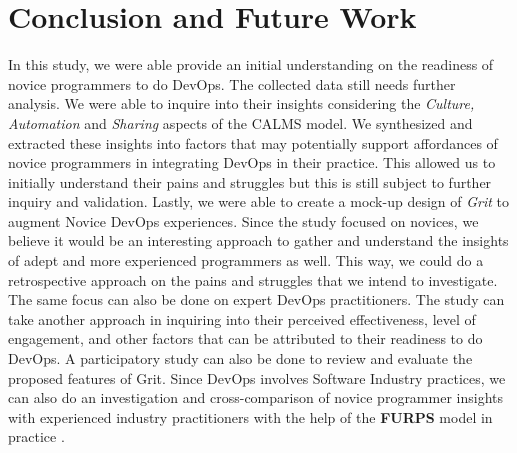 \documentclass{sigchi}
\begin{document}
\section{Conclusion and Future Work}
In this study, we were able provide an initial understanding on the readiness of novice programmers to do DevOps. The collected data still needs further analysis. We were able to inquire into their insights considering the \textit{Culture, Automation} and \textit{Sharing} aspects of the CALMS model. We synthesized and extracted these insights into factors that may potentially support affordances of novice programmers in integrating DevOps in their practice. This allowed us to initially understand their pains and struggles but this is still subject to further inquiry and validation. Lastly, we were able to create a mock-up design of \textit{Grit} to augment Novice DevOps experiences. Since the study focused on novices, we believe it would be an interesting approach to gather and understand the insights of adept and more experienced programmers as well. This way, we could do a retrospective approach on the pains and struggles that we intend to investigate. The same focus can also be done on expert DevOps practitioners. The study can take another approach in inquiring into their perceived effectiveness, level of engagement, and other factors that can be attributed to their readiness to do DevOps. A participatory study can also be done to review and evaluate the proposed features of Grit. Since DevOps involves Software Industry practices, we can also do an investigation and cross-comparison of novice programmer insights with experienced industry practitioners with the help of the \textbf{FURPS} model in practice \cite{al2010quality}.
\balance{}


\end{document}
